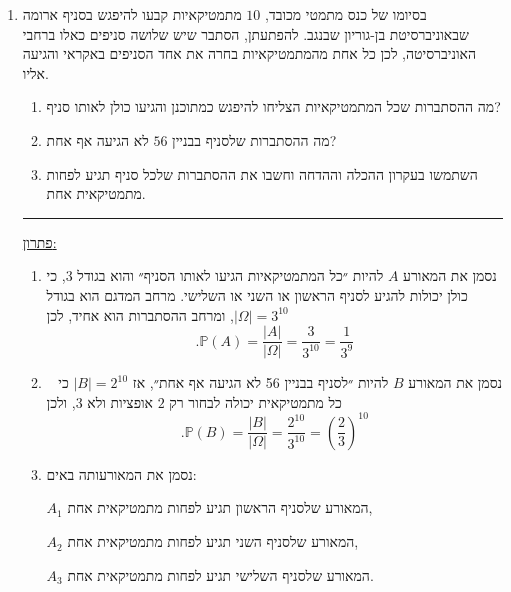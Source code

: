 \documentclass[12pt, a4paper]{article}
\newcommand{\PP}{\mathbb{P}}
\begin{document}
\begin{enumerate}

\item
בסיומו של כנס מתמטי מכובד,
$10$
 מתמטיקאיות קבעו להיפגש בסניף ארומה שבאוניברסיטת בן-גוריון שבנגב. 
 להפתעתן, הסתבר שיש
שלושה סניפים כאלו ברחבי האוניברסיטה,
לכן כל אחת מהמתמטיקאיות  בחרה את אחד הסניפים באקראי והגיעה אליו.
\begin{enumerate}
\item
מה ההסתברות שכל המתמטיקאיות הצליחו להיפגש כמתוכנן והגיעו כולן לאותו סניף?
\item
מה ההסתברות שלסניף בבניין 
$56$
לא הגיעה אף אחת?
\item
השתמשו בעקרון ההכלה וההדחה וחשבו את ההסתברות שלכל סניף תגיע לפחות מתמטיקאית אחת.
\end{enumerate}

\noindent\rule{15cm}{0.4pt}

\underline{פתרון:}

\begin{enumerate}
\item
נסמן את המאורע
$A$
להיות ״כל המתמטיקאיות הגיעו לאותו הסניף״
והוא בגודל
$3$,
כי כולן יכולות להגיע לסניף הראשון או השני או השלישי. 
 מרחב המדגם הוא בגודל
 $|\Omega|=3^{10}$,
 ומרחב ההסתברות הוא אחיד, לכן
$$\boxed{.\PP(A)=\frac{|A|}{|\Omega|}=\frac{3}{3^{10}}=\frac{1}{3^9}}$$

\item 
נסמן את המאורע
$B$
להיות ״לסניף בבניין 56 לא הגיעה אף אחת״, אז
$|B|=2^{10}$
כי  כל מתמטיקאית יכולה לבחור רק
$2$
אופציות ולא
$3$,
 ולכן
$$\boxed{.\PP(B)=\frac{|B|}{|\Omega|}=\frac{2^{10}}{3^{10}}=
\left(\frac{2}{3}\right)^{10}}$$
\item
נסמן את המאורעותה באים:

$A_1$
המאורע שלסניף הראשון תגיע לפחות מתמטיקאית אחת,

$A_2$
המאורע שלסניף השני תגיע לפחות מתמטיקאית אחת,

$A_3$
המאורע שלסניף השלישי תגיע לפחות מתמטיקאית אחת.


\end{enumerate}
\end{enumerate}
\end{document}
